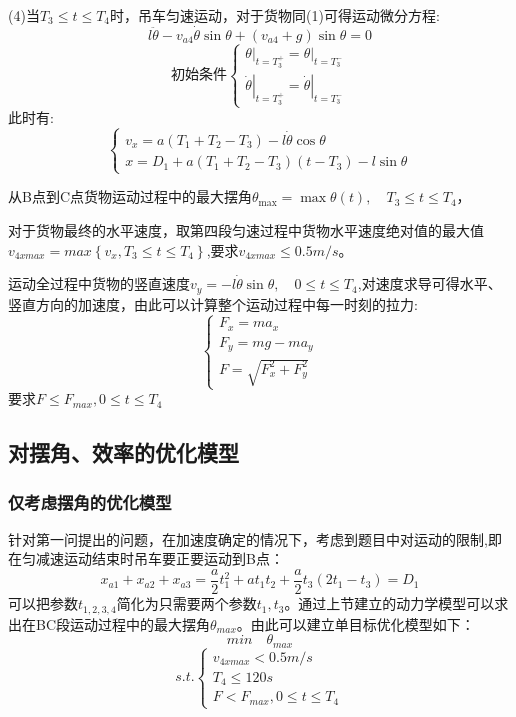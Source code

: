 \documentclass[withoutpreface,bwprint]{cumcmthesis} %
\begin{document}
(4)当$T_3 \leq t \leq T_4$时，吊车匀速运动，对于货物同(1)可得运动微分方程:
$$l\ddot{\theta}-v_{a4}\dot{\theta}\sin\theta+(v_{a4}+g) \sin \theta=0$$
$$\text{初始条件}\left \{\begin{array}{l}
        \left.\theta\right|_{t=T_{3}^{+}}=\left.\theta\right|_{t=T_{3}^{-}} \\
        \left.\dot{\theta}\right|_{t=T_{3}^{+}}=\left.\dot{\theta}\right|_{t=T_{3}^{-}}
    \end{array}\right.$$
此时有:$$\left\{\begin{array}{l}
        v_{x}=a\left(T_1+T_{2}-T_{3}\right)-l \dot{\theta} \cos \theta \\
        x=D_1+a\left(T_{1}+T_{2}-T_{3}\right)\left(t-T_{3}\right)-l \sin \theta
    \end{array}\right.$$

从B点到C点货物运动过程中的最大摆角$\theta_{\max }=\max \theta(t), \quad T_3 \leqslant t \leqslant T_{4}$，

对于货物最终的水平速度，取第四段匀速过程中货物水平速度绝对值的最大值$v_{4xmax}=max\left \{v_{x},T_3 \leq t \leq T_4\right \}$,要求$v_{4xmax} \leq 0.5m/s$。

运动全过程中货物的竖直速度$v_{y}=-l\dot{\theta}\sin\theta,\quad 0\leq t\leq T_4$,对速度求导可得水平、竖直方向的加速度，由此可以计算整个运动过程中每一时刻的拉力:$$\left\{\begin{array}{l}
        F_{x}=m a_{x}   \\
        F_{y}=mg-ma_{y} \\
        F=\sqrt{F_{x}^2 + F_{y}^2}
    \end{array}\right.$$
要求$F \leq F_{max},0 \leq t \leq T_4$

\subsection{对摆角、效率的优化模型}
\subsubsection{仅考虑摆角的优化模型}
针对第一问提出的问题，在加速度确定的情况下，考虑到题目中对运动的限制,即在匀减速运动结束时吊车要正要运动到B点：$$x_{a1}+x_{a2}+x_{a3}=\frac{a}{2}t_1^2+at_1t_2+\frac{a}{2}t_3(2t_1-t_3)=D_1$$可以把参数$t_{1,2,3,4}$简化为只需要两个参数$t_1,t_3$。通过上节建立的动力学模型可以求出在BC段运动过程中的最大摆角$\theta_{max}$。由此可以建立单目标优化模型如下：
$$min\quad \theta_{max}$$
$$\text{$s.t.$}\left \{\begin{array}{l}
        v_{4xmax}<0.5m/s \\
        T_4\leq120s      \\
        F<F_{max},0\leq t\leq T_4
    \end{array}\right.$$
\end{document}
